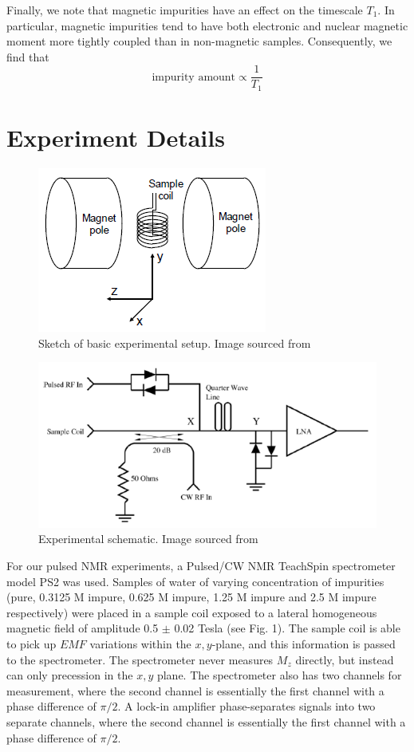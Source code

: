 \documentclass[aps,prl,nofootinbib,twocolumn,superscriptaddress,groupedaddress]{revtex4}  %
\begin{document}
Finally, we note that magnetic impurities have an effect on the timescale $T_{1}$. In particular, magnetic impurities tend to have both electronic and nuclear magnetic moment more tightly coupled than in non-magnetic samples. Consequently, we find that\cite{lab} 
\begin{equation}
\textrm{impurity amount} \propto \frac{1}{T_{1}}
\end{equation}

\section{Experiment Details}

\begin{figure}[t]
\centering
\includegraphics[scale = 0.6]{instrument.PNG}
\caption{Sketch of basic experimental setup. Image sourced from \cite{inst}} 
\end{figure}

\begin{figure}[t]
\centering
\includegraphics[scale = 0.6]{schematic.PNG}
\caption{Experimental schematic. Image sourced from \cite{inst}} 
\end{figure}

For our pulsed NMR experiments, a Pulsed/CW NMR TeachSpin spectrometer model PS2 was used. Samples of water of varying concentration of impurities (pure, 0.3125 M impure, 0.625 M impure, 1.25 M impure and 2.5 M impure respectively) were placed in a sample coil exposed to a lateral homogeneous magnetic field of amplitude 0.5 $\pm$ 0.02 Tesla (see Fig. 1). The sample coil is able to pick up $EMF$ variations within the $x,y$-plane, and this information is passed to the spectrometer. The spectrometer never measures $M_{z}$ directly, but instead can only precession in the $x,y$ plane. The spectrometer also has two channels for measurement, where the second channel is essentially the first channel with a phase difference of $\pi/2$. A lock-in amplifier phase-separates signals into two separate channels, where the second channel is essentially the first channel with a phase difference of $\pi/2$.
\end{document}
